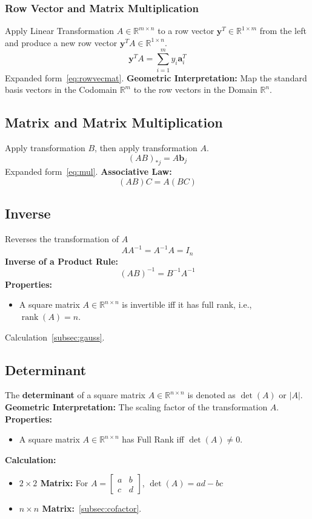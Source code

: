 \documentclass{article}
\begin{document}
\subsubsection{Row Vector and Matrix Multiplication}
Apply Linear Transformation $A \in \mathbb{R}^{m \times n}$ to a row vector $\mathbf{y}^T \in \mathbb{R}^{1 \times m}$ from the left and produce a new row vector $\mathbf{y}^T A \in \mathbb{R}^{1 \times n}$.
\[
    \mathbf{y}^T A = \sum_{i=1}^m y_i \mathbf{a}_i^T
\]
Expanded form~\ref{eq:rowvecmat}.
\newline
\textbf{Geometric Interpretation:} Map the standard basis vectors in the Codomain $\mathbb{R}^m$ to the row vectors in the Domain $\mathbb{R}^n$.

\subsection{Matrix and Matrix Multiplication}
Apply transformation $B$, then apply transformation $A$.
\[
    (AB)_{*j} = A\mathbf{b}_j
\]
Expanded form~\ref{eq:mul}.
\newline
\textbf{Associative Law:}
\[
    (AB)C = A(BC)
\]

\subsection{Inverse}
Reverses the transformation of $A$
\[
    A A^{-1} = A^{-1} A = I_n
\]
\textbf{Inverse of a Product Rule:}
\[
    (AB)^{-1} = B^{-1}A^{-1}
\]
\textbf{Properties:}
\begin{itemize}
    \item A square matrix $A \in \mathbb{R}^{n \times n}$ is invertible iff it has full rank, i.e., $\operatorname{rank}(A) = n$.
\end{itemize}
Calculation~\ref{subsec:gauss}.

\subsection{Determinant}
The \textbf{determinant} of a square matrix $A \in \mathbb{R}^{n \times n}$ is denoted as $\det(A)$ or $|A|$.
\newline
\textbf{Geometric Interpretation:} The scaling factor of the transformation $A$.
\newline
\textbf{Properties:}
\begin{itemize}
    \item A square matrix $A \in \mathbb{R}^{n \times n}$ has Full Rank iff $\det(A) \neq 0$.
\end{itemize}
\newline
\textbf{Calculation:}
\begin{itemize}
    \item \textbf{$2 \times 2$ Matrix:} For $A = \begin{bmatrix} a & b \\ c & d \end{bmatrix}$, $\det(A) = ad - bc$
    \item \textbf{$n \times n$ Matrix:}~\ref{subsec:cofactor}.
\end{itemize}
\end{document}
